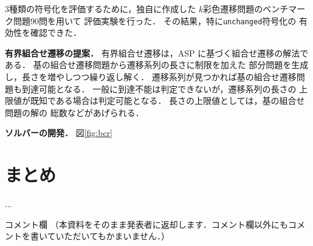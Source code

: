 \documentclass[a4j,10pt,dvipdfmx]{jarticle}
\newcommand{\code}[1]{\lstinline[basicstyle=\ttfamily]{#1}}
\begin{document}
\begin{multicols}{1}
3種類の符号化を評価するために，独自に作成した
$k$彩色遷移問題のベンチマーク問題90問を用いて
評価実験を行った．
その結果，特に\code{unchanged}符号化の
有効性を確認できた．

\textbf{有界組合せ遷移の提案．} 
有界組合せ遷移は，ASP に基づく組合せ遷移の解法である．
基の組合せ遷移問題から遷移系列の長さに制限を加えた
部分問題を生成し，長さを増やしつつ繰り返し解く．
遷移系列が見つかれば基の組合せ遷移問題も到達可能となる．
一般に到達不能は判定できないが，遷移系列の長さの
上限値が既知である場合は判定可能となる．
長さの上限値としては，基の組合せ問題の解の
総数などがあげられる．

\textbf{ソルバーの開発．}
図\ref{fig:bcr}

\section{まとめ}



\begin{thebibliography}{10}

 ...

\end{thebibliography}

\end{multicols}
\vfill
\noindent
{\gt コメント欄}
{\footnotesize
（本資料をそのまま発表者に返却します．コメント欄以外にもコメントを書いていただいてもかまいません．）}
\\
\fbox{\begin{minipage}{\textwidth}\noindent\\\\\end{minipage}}	
\end{document}
